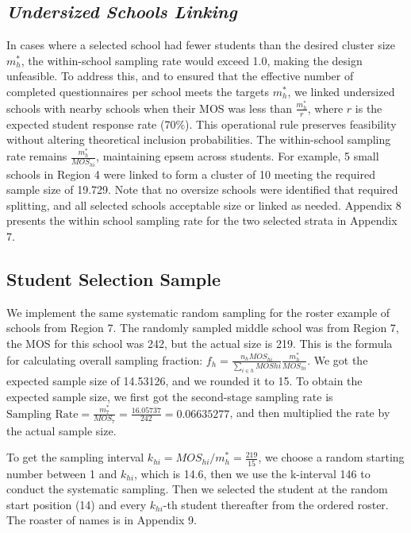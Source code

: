 \documentclass[
  12pt]{article}
\begin{document}
\subsection{\texorpdfstring{\emph{Undersized Schools
Linking}}{Undersized Schools Linking}}\label{undersized-schools-linking}

In cases where a selected school had fewer students than the desired
cluster size \(m^*_h\), the within-school sampling rate would exceed
1.0, making the design unfeasible. To address this, and to ensured that
the effective number of completed questionnaires per school meets the
targets \(m^*_h\), we linked undersized schools with nearby schools when
their MOS was less than \(\frac{m^*_h}{r}\), where \(r\) is the expected
student response rate (70\%). This operational rule preserves
feasibility without altering theoretical inclusion probabilities. The
within-school sampling rate remains \(\frac{m^*_h}{MOS_{hi}}\),
maintaining epsem across students. For example, 5 small schools in
Region 4 were linked to form a cluster of 10 meeting the required sample
size of 19.729. Note that no oversize schools were identified that
required splitting, and all selected schools acceptable size or linked
as needed. Appendix 8 presents the within school sampling rate for the
two selected strata in Appendix 7.

\subsection{Student Selection Sample}\label{student-selection-sample}

We implement the same systematic random sampling for the roster example
of schools from Region 7. The randomly sampled middle school was from
Region 7, the MOS for this school was 242, but the actual size is 219.
This is the formula for calculating overall sampling fraction:
\(f_h = \frac{n_h MOS_{hi} }{\sum_{i \in h} MOS{hi} } \frac{m^*_h}{MOS_{hi}}\).
We got the expected sample size of 14.53126, and we rounded it to 15. To
obtain the expected sample size, we first got the second-stage sampling
rate is
\(\text{Sampling Rate} = \frac{m^*_{7}}{MOS_7} = \frac{16.05737}{242} = 0.06635277\),
and then multiplied the rate by the actual sample size.

To get the sampling interval
\(k_{hi} = MOS_{hi} / m^*_{h} = \frac{219}{15}\), we choose a random
starting number between 1 and \(k_{hi}\), which is 14.6, then we use the
k-interval 146 to conduct the systematic sampling. Then we selected the
student at the random start position (14) and every \(k_{hi}\)-th
student thereafter from the ordered roster. The roaster of names is in
Appendix 9.
\end{document}
